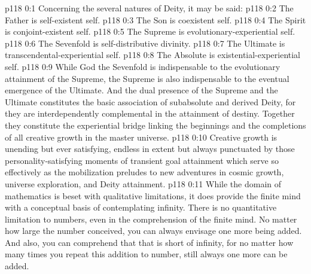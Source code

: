 \author{Mighty Messenger}
\vs p118 0:1 Concerning the several natures of Deity, it may be said:
\vs p118 0:2 \bibnobreakspace The Father is self\hyp{}existent self.
\vs p118 0:3 \bibnobreakspace The Son is coexistent self.
\vs p118 0:4 \bibnobreakspace The Spirit is conjoint\hyp{}existent self.
\vs p118 0:5 \bibnobreakspace The Supreme is evolutionary\hyp{}experiential self.
\vs p118 0:6 \bibnobreakspace The Sevenfold is self\hyp{}distributive divinity.
\vs p118 0:7 \bibnobreakspace The Ultimate is transcendental\hyp{}experiential self.
\vs p118 0:8 \bibnobreakspace The Absolute is existential\hyp{}experiential self.
\vs p118 0:9 \pc While God the Sevenfold is indispensable to the evolutionary attainment of the Supreme, the Supreme is also indispensable to the eventual emergence of the Ultimate. And the dual presence of the Supreme and the Ultimate constitutes the basic association of subabsolute and derived Deity, for they are interdependently complemental in the attainment of destiny. Together they constitute the experiential bridge linking the beginnings and the completions of all creative growth in the master universe.
\vs p118 0:10 \pc Creative growth is unending but ever satisfying, endless in extent but always punctuated by those personality\hyp{}satisfying moments of transient goal attainment which serve so effectively as the mobilization preludes to new adventures in cosmic growth, universe exploration, and Deity attainment.
\vs p118 0:11 While the domain of mathematics is beset with qualitative limitations, it does provide the finite mind with a conceptual basis of contemplating infinity. There is no quantitative limitation to numbers, even in the comprehension of the finite mind. No matter how large the number conceived, you can always envisage one more being added. And also, you can comprehend that that is short of infinity, for no matter how many times you repeat this addition to number, still always one more can be added.

